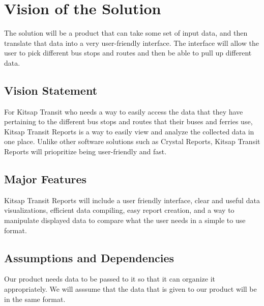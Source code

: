 \section{Vision of the Solution}

The solution will be a product that can take some set of input data, and then 
translate that data into a very user-friendly interface. The interface will 
allow the user to pick different bus stops and routes and then be able to 
pull up different data.

\subsection{Vision Statement}
%

For Kitsap Transit who needs a way to easily access the data that they have
pertaining to the different bus stops and routes that their buses and ferries
use, Kitsap Transit Reports is a way to easily view and analyze the collected data
in one place. Unlike other software solutions such as Crystal Reports, 
Kitsap Transit Reports will priopritize being user-friendly and fast.
  
\subsection{Major Features}

Kitsap Transit Reports will include a user friendly interface, clear and useful 
data visualizations, efficient data compiling, easy report creation, and a way to 
manipulate displayed data to compare what the user needs in a simple to use format.

\subsection{Assumptions and Dependencies}

Our product needs data to be passed to it so that it can organize it appropriately.
We will asssume that the data that is given to our product will be in the same format. 
